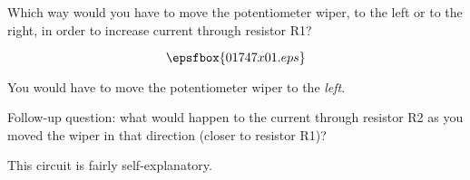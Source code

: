 

Which way would you have to move the potentiometer wiper, to the left or to the right, in order to increase current through resistor R1?

$$\epsfbox{01747x01.eps}$$







You would have to move the potentiometer wiper to the {\it left}.

\vskip 10pt

Follow-up question: what would happen to the current through resistor R2 as you moved the wiper in that direction (closer to resistor R1)?







This circuit is fairly self-explanatory.





